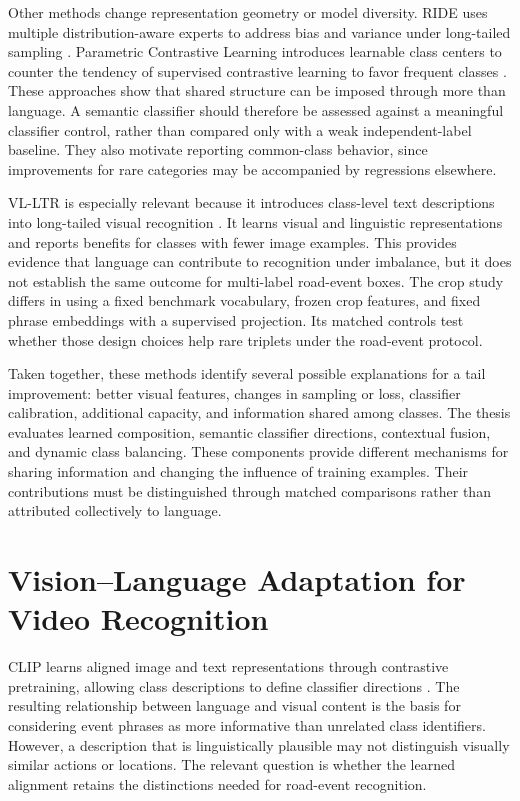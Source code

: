 Other methods change representation geometry or model diversity. RIDE uses multiple distribution-aware experts to address bias and variance under long-tailed sampling \cite{ride}. Parametric Contrastive Learning introduces learnable class centers to counter the tendency of supervised contrastive learning to favor frequent classes \cite{paco}. These approaches show that shared structure can be imposed through more than language. A semantic classifier should therefore be assessed against a meaningful classifier control, rather than compared only with a weak independent-label baseline. They also motivate reporting common-class behavior, since improvements for rare categories may be accompanied by regressions elsewhere.

VL-LTR is especially relevant because it introduces class-level text descriptions into long-tailed visual recognition \cite{vl-ltr}. It learns visual and linguistic representations and reports benefits for classes with fewer image examples. This provides evidence that language can contribute to recognition under imbalance, but it does not establish the same outcome for multi-label road-event boxes. The crop study differs in using a fixed benchmark vocabulary, frozen crop features, and fixed phrase embeddings with a supervised projection. Its matched controls test whether those design choices help rare triplets under the road-event protocol.

Taken together, these methods identify several possible explanations for a tail improvement: better visual features, changes in sampling or loss, classifier calibration, additional capacity, and information shared among classes. The thesis evaluates learned composition, semantic classifier directions, contextual fusion, and dynamic class balancing. These components provide different mechanisms for sharing information and changing the influence of training examples. Their contributions must be distinguished through matched comparisons rather than attributed collectively to language.

\section{Vision--Language Adaptation for Video Recognition}

CLIP learns aligned image and text representations through contrastive pretraining, allowing class descriptions to define classifier directions \cite{clip}. The resulting relationship between language and visual content is the basis for considering event phrases as more informative than unrelated class identifiers. However, a description that is linguistically plausible may not distinguish visually similar actions or locations. The relevant question is whether the learned alignment retains the distinctions needed for road-event recognition.

